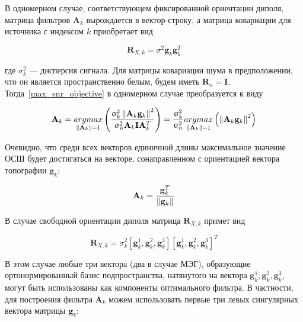 В одномерном случае, соответствующем фиксированной ориентации диполя,
матрица фильтров $\mathbf{A}_k$ вырождается в вектор-строку,
а матрица ковариации для источника с индексом $k$ приобретает вид

\begin{equation}
    \mathbf{R}_{X,k} = \sigma^2 \mathbf{g}_k \mathbf{g}_k^T
\end{equation}

где $\sigma^2_k$ --- дисперсия сигнала.
Для матрицы ковариации шума в предположении, что он является пространственно белым, 
будем иметь $\mathbf{R}_n = \mathbf{I}$.
Тогда~\ref{max_snr_objective} в одномерном случае преобразуется к виду

\begin{equation}
    \mathbf{A}_k =
        \underset{\left\lVert\mathbf{A}_k\right\rVert = 1}{argmax}\left(
            \frac{\upsigma_k^2\left\lVert\mathbf{A}_k \mathbf{g}_k\right\rVert^2}
                 {\upsigma_n^2\mathbf{A}_k \mathbf{I} \mathbf{A}_k^T}
             \right) = \frac{\upsigma_k^2}{\upsigma_n^2}\underset{\left\lVert\mathbf{A}_k\right\rVert = 1}{argmax}\left(
                \left\lVert\mathbf{A}_k \mathbf{g}_k\right\rVert^2
             \right)
\end{equation}


Очевидно, что среди всех векторов единичной длины максимальное значение ОСШ
будет достигаться на векторе, сонаправленном с ориентацией вектора топографии $\mathbf{g}_k$:

\begin{equation}
    \mathbf{A}_k = \frac{\mathbf{g}_k^T}{\left\lVert\mathbf{g}_k\right\rVert}
\end{equation}

В случае свободной ориентации диполя матрица $\mathbf{R}_{X,k}$ примет вид

\begin{equation}
    \mathbf{R}_{X,k} = \sigma_k^2 \left[ \mathbf{g}_k^1, \mathbf{g}_k^2, \mathbf{g}_k^3 \right] \left[\mathbf{g}_k^1, \mathbf{g}_k^2, \mathbf{g}_k^3\right]^T
\end{equation}

В этом случае любые три вектора (два в случае МЭГ),
образующие ортонормированный базис подпространства, натянутого на
вектора $\mathbf{g}_k^1, \mathbf{g}_k^2, \mathbf{g}_k^3$,
могут быть использованы как компоненты оптимального фильтра.
В частности, для построения фильтра $\mathbf{A}_k$ можем использовать
первые три левых сингулярных вектора матрицы $\mathbf{g}_k$:

